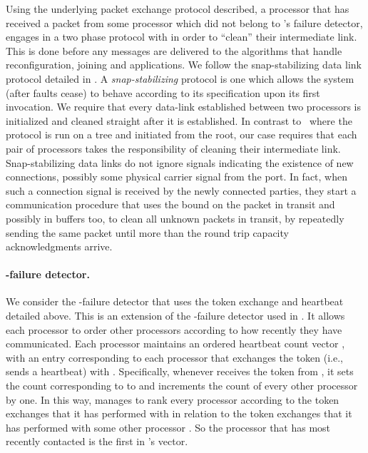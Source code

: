 \documentclass[11pt]{article}
\begin{document}
Using the underlying packet exchange protocol described, a processor  that has received a packet from some processor  which did not belong to 's failure detector, engages in a two phase protocol with  in order to ``clean'' their intermediate link. 
This is done before any messages are delivered to the algorithms that handle reconfiguration, joining and applications.
We follow the snap-stabilizing data link protocol detailed in \cite{DBLP:journals/tcs/DolevT09}.
A \emph{snap-stabilizing} protocol is one which allows the system (after faults cease) to behave according to its specification upon its first invocation.
We require that every data-link established between two processors is initialized and cleaned straight after it is established.
In contrast to~\cite{DBLP:journals/tcs/DolevT09} where the protocol is run on a tree and initiated from the root, our case requires that each pair of processors takes the responsibility of cleaning their intermediate link.
Snap-stabilizing data links do not ignore signals indicating the existence of new connections, possibly some physical carrier signal from the port. 
In fact, when such a connection signal is received by the newly connected parties, they start a communication procedure that uses the bound on the packet in transit and possibly in buffers too, to clean all unknown packets in transit, by repeatedly sending the same packet until more than the round trip capacity acknowledgments arrive.\vspace{.3em}









\paragraph{-failure detector.} We consider the -failure detector that uses the token exchange and heartbeat detailed above.
This is an extension of the -failure detector used in \cite{Blanchard2013SSPaxos}. 
It allows each processor  to order other processors according to how recently they have communicated.
Each processor  maintains an ordered heartbeat count vector , with an entry corresponding to each processor  that exchanges the token (i.e., sends a heartbeat) with .
Specifically, whenever  receives the token from , it sets the count corresponding to  to  and increments the count of every other processor by one.
In this way,  manages to rank every processor  according to the token exchanges that it has performed with  in relation to the token exchanges that it has performed with some other processor .
So the processor that has most recently contacted  is the first in 's vector.
\end{document}
